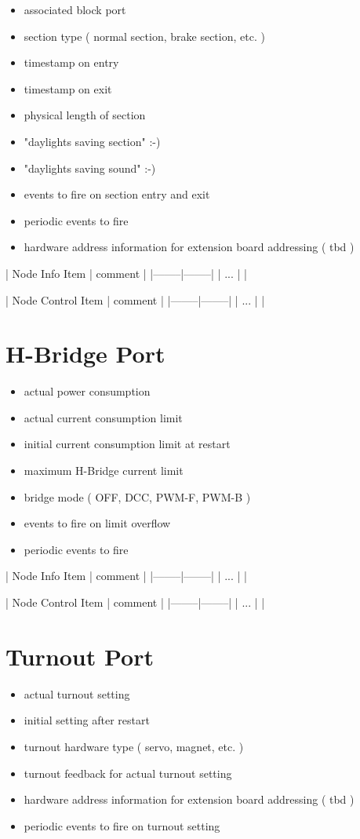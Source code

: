 \begin{itemize}
\item associated block port
\item section type ( normal section, brake section, etc. )
\item timestamp on entry
\item timestamp on exit
\item physical length of section
\item "daylights saving section" :-)
\item "daylights saving sound" :-)
\item events to fire on section entry and exit
\item periodic events to fire
\item hardware address information for extension board addressing ( tbd )
\end{itemize}

| Node Info Item | comment |
|--------|--------|
| ... | |

| Node Control Item | comment |
|--------|--------|
| ... | |

\section{H-Bridge Port}

\begin{itemize}
\item actual power consumption
\item actual current consumption limit
\item initial current consumption limit at restart
\item maximum H-Bridge current limit
\item bridge mode ( OFF, DCC, PWM-F, PWM-B )
\item events to fire on limit overflow
\item periodic events to fire
\end{itemize}

| Node Info Item | comment |
|--------|--------|
| ... | |

| Node Control Item | comment |
|--------|--------|
| ... | |


\section{Turnout Port}

\begin{itemize}
\item actual turnout setting
\item initial setting after restart
\item turnout hardware type ( servo, magnet, etc. )
\item turnout feedback for actual turnout setting
\item hardware address information for extension board addressing ( tbd )
\item periodic events to fire on turnout setting
\end{itemize}

